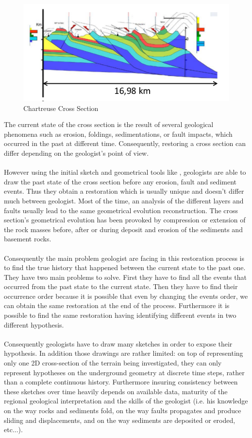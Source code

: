 \documentclass[12pt, a4paper]{report} %
\begin{document}
\begin{figure}[H]
	\centering
	\includegraphics[scale=0.8]{Wraped_Section.png}
	\caption{Chartreuse Cross Section}
	\label{crossxeg}
\end{figure}
The current state of the cross section is the result of several geological phenomena such as erosion, foldings, sedimentations, or fault impacts, which occurred in the past at different time. Consequently, restoring a cross section can differ depending on the geologist's point of view.\\\\
However using the initial sketch  and geometrical tools like \cite{Move}, geologists are able to draw the past state of the cross section before any erosion, fault and sediment events. Thus they obtain a restoration which is usually unique and doesn't differ much between geologist. 
Most of the time, an analysis of the different layers and faults usually lead to the same geometrical evolution reconstruction. The cross section's geometrical evolution has been provoked by compression or extension of the rock masses before, after or during deposit and erosion of the sediments and basement rocks. \\\\
Consequently the main problem geologist are facing in this restoration process is to find the true history that happened between the current state to the past one. They have two main problems to solve. First they have to find all the events that occurred from the past state to the current state. Then they have to find their occurrence order because it is possible that even by changing the events order, we can obtain the same restoration at the end of the process. Furthermore it is possible to find the same restoration having identifying different events in two different hypothesis. \\\\
Consequently geologists have to draw many sketches in order to expose their hypothesis. In addition those drawings are rather limited: on top of representing only one 2D cross-section of the terrain being investigated, they can only represent hypotheses on the underground geometry at discrete time steps, rather than a complete continuous history. Furthermore insuring consistency between these sketches over time heavily depends on available data, maturity of the regional geological interpretation and the skills of the geologist (i.e. his knowledge on the way rocks and sediments fold, on the way faults propagates and produce sliding and displacements, and on the way sediments are deposited or eroded, etc...).\\\\
\end{document}
